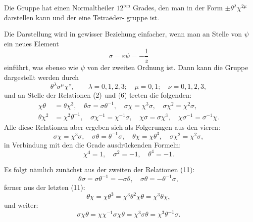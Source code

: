 \documentclass[12pt,a4paper]{article}
\theoremstyle{plain}
\theoremstyle{definition}
\theoremstyle{remark}
\begin{document}
Die Gruppe hat einen Normaltheiler $12^{\text{ten}}$ Grades, den man
in der Form $\pm \theta^\lambda \chi^{2\mu}$ darstellen kann und der eine Tetra\"eder-
gruppe ist.

Die Darstellung wird in gewisser Beziehung einfacher, wenn
man an Stelle von $\psi$ ein neues Element
\begin{equation}\label{eq:57_9}
\sigma = \varepsilon\psi = -\frac{1}{z}\tag{9}
\end{equation}
einf\"uhrt, was ebenso wie $\psi$ von der zweiten Ordnung ist. Dann
kann die Gruppe dargestellt werden durch
\[
\theta^\lambda \sigma^\mu \chi^\nu,\qquad \lambda = 0, 1, 2, 3;\quad \mu = 0, 1;\quad \nu = 0, 1, 2, 3,
\]
und an Stelle der Relationen (2) und (6) treten die folgenden:
\begin{equation}\label{eq:57_10}
\begin{aligned}
\chi\theta &= \theta\chi^3,\quad \theta\sigma = \sigma\theta^{-1},\quad \sigma\chi = \chi^3\sigma,\quad \sigma\chi^2 = \chi^2\sigma,\\
\theta\chi^2 &= \chi^2\theta^{-1},\quad \sigma\chi^{-1} = \chi^{-1}\sigma,\quad \chi\sigma = \sigma\chi^3,\quad \chi\sigma^{-1} = \sigma^{-1}\chi.
\end{aligned}\tag{10}
\end{equation}
Alle diese Relationen aber ergeben sich als Folgerungen
aus den vieren:
\begin{equation}\label{eq:57_11}
\sigma\chi = \chi^3\sigma,\quad \sigma\theta = \theta^{-1}\sigma,\quad \theta\chi = \chi\theta^3,\quad \sigma\chi^2 = \chi^2\sigma,\tag{11}
\end{equation}
in Verbindung mit den die Grade ausdr\"uckenden Formeln:
\begin{equation}\label{eq:57_12}
\chi^4 = 1,\quad \sigma^2 = -1,\quad \theta^4 = -1.\tag{12}
\end{equation}

Es folgt n\"amlich zun\"achst aus der zweiten der Relationen (11):
\[
\theta\sigma = \sigma\theta^{-1} = -\sigma\theta,\quad \sigma\theta = -\theta^{-1}\sigma,
\]
ferner aus der letzten (11):
\[
\theta\chi = \chi\theta^3 = \chi^3\theta^2\chi\theta = \chi^3\theta\chi,
\]
und weiter:
\[
\sigma\chi\theta = \chi\chi^{-1}\sigma\chi\theta = \chi^3\sigma\theta = \chi^3\theta^{-1}\sigma.
\]
\end{document}
